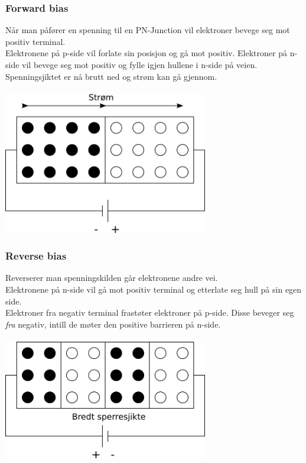 \subsubsection{Forward bias}
Når man påfører en spenning til en PN-Junction
vil elektroner bevege seg mot positiv terminal.
\\
Elektronene på p-side vil forlate sin posisjon og gå mot positiv.
Elektroner på n-side vil bevege seg mot positiv
og fylle igjen hullene i n-side på veien.
\\
Spenningsjiktet er nå brutt ned og strøm kan gå gjennom.
\\\\
\includegraphics[width=0.67\textwidth]{./img/pn-forward}

\subsubsection{Reverse bias}
Reverserer man spenningskilden går elektronene andre vei.
\\
Elektronene på n-side vil gå mot positiv terminal
og etterlate seg hull på sin egen side.\\
Elektroner fra negativ terminal frastøter elektroner på p-side.
Disse beveger seg \emph{fra} negativ,
intill de møter den positive barrieren på n-side.
\\\\
\includegraphics[width=0.67\textwidth]{./img/pn-reverse}
